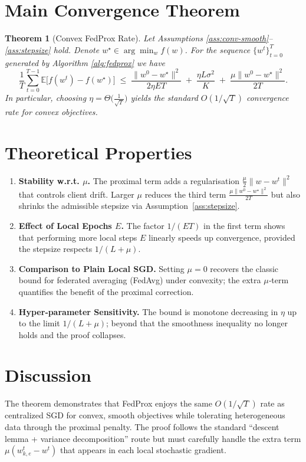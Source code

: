 \documentclass{article}
\newtheorem{theorem}{Theorem}
\newcommand{\EE}{\mathbb{E}}
\begin{document}
\section*{Main Convergence Theorem}
\begin{theorem}[Convex FedProx Rate]\label{thm:conv}
Let Assumptions \ref{ass:conv-smooth}–\ref{ass:stepsize} hold.  Denote $w^\star\in\arg\min_{w}f(w)$.  For the sequence $\{w^{t}\}_{t=0}^{T}$ generated by Algorithm \ref{alg:fedprox} we have
\[
\frac{1}{T}\sum_{t=0}^{T-1}\EE\!\big[f(w^{t})-f(w^\star)\big]
\;\le\;
\frac{\|w^{0}-w^\star\|^2}{2\eta E T}
\;+\;
\frac{\eta L\sigma^2}{K}
\;+\;
\frac{\mu\|w^{0}-w^\star\|^2}{2T}.
\]
In particular, choosing $\eta=\Theta\!\big(\tfrac{1}{\sqrt{T}}\big)$ yields the standard $O(1/\sqrt{T})$ convergence rate for convex objectives.
\end{theorem}

\section*{Theoretical Properties}
\begin{enumerate}[label=\arabic*.]
    \item \textbf{Stability w.r.t. $\mu$.}  The proximal term adds a regularisation $\frac{\mu}{2}\|w-w^{t}\|^2$ that controls client drift.  Larger $\mu$ reduces the third term $\frac{\mu\|w^{0}-w^\star\|^2}{2T}$ but also shrinks the admissible stepsize via Assumption~\ref{ass:stepsize}.
    \item \textbf{Effect of Local Epochs $E$.}  The factor $1/(E T)$ in the first term shows that performing more local steps $E$ linearly speeds up convergence, provided the stepsize respects $1/(L+\mu)$.
    \item \textbf{Comparison to Plain Local SGD.}  Setting $\mu=0$ recovers the classic bound for federated averaging (FedAvg) under convexity; the extra $\mu$‑term quantifies the benefit of the proximal correction.
    \item \textbf{Hyper‑parameter Sensitivity.}  The bound is monotone decreasing in $\eta$ up to the limit $1/(L+\mu)$; beyond that the smoothness inequality no longer holds and the proof collapses.
\end{enumerate}

\section*{Discussion}
The theorem demonstrates that FedProx enjoys the same $O(1/\sqrt{T})$ rate as centralized SGD for convex, smooth objectives while tolerating heterogeneous data through the proximal penalty.  The proof follows the standard “descent lemma + variance decomposition” route but must carefully handle the extra term $\mu(w_{k,e}^{t}-w^{t})$ that appears in each local stochastic gradient.
\end{document}
